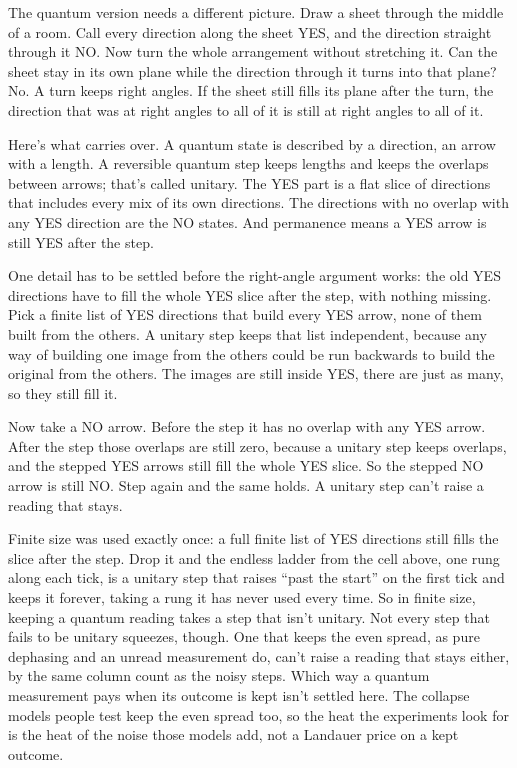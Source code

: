 \documentclass[11pt,twoside]{article}
\theoremstyle{thielethm}
\theoremstyle{thieledef}
\theoremstyle{thieledef}
\theoremstyle{thieledef}
\theoremstyle{thielethm}
\theoremstyle{thieleobs}
\theoremstyle{thielethm}
\begin{document}
The quantum version needs a different picture. Draw a sheet through the middle of a room. Call every direction along the sheet YES, and the direction straight through it NO. Now turn the whole arrangement without stretching it. Can the sheet stay in its own plane while the direction through it turns into that plane? No. A turn keeps right angles. If the sheet still fills its plane after the turn, the direction that was at right angles to all of it is still at right angles to all of it.

Here's what carries over. A quantum state is described by a direction, an arrow with a length. A reversible quantum step keeps lengths and keeps the overlaps between arrows; that's called unitary. The YES part is a flat slice of directions that includes every mix of its own directions. The directions with no overlap with any YES direction are the NO states. And permanence means a YES arrow is still YES after the step.

One detail has to be settled before the right-angle argument works: the old YES directions have to fill the whole YES slice after the step, with nothing missing. Pick a finite list of YES directions that build every YES arrow, none of them built from the others. A unitary step keeps that list independent, because any way of building one image from the others could be run backwards to build the original from the others. The images are still inside YES, there are just as many, so they still fill it.

Now take a NO arrow. Before the step it has no overlap with any YES arrow. After the step those overlaps are still zero, because a unitary step keeps overlaps, and the stepped YES arrows still fill the whole YES slice. So the stepped NO arrow is still NO. Step again and the same holds. A unitary step can't raise a reading that stays.

Finite size was used exactly once: a full finite list of YES directions still fills the slice after the step. Drop it and the endless ladder from the cell above, one rung along each tick, is a unitary step that raises ``past the start'' on the first tick and keeps it forever, taking a rung it has never used every time. So in finite size, keeping a quantum reading takes a step that isn't unitary. Not every step that fails to be unitary squeezes, though. One that keeps the even spread, as pure dephasing and an unread measurement do, can't raise a reading that stays either, by the same column count as the noisy steps. Which way a quantum measurement pays when its outcome is kept isn't settled here. The collapse models people test keep the even spread too, so the heat the experiments look for is the heat of the noise those models add, not a Landauer price on a kept outcome.
\end{document}
